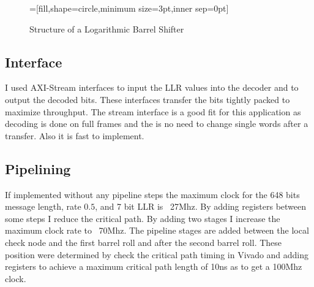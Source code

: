 \begin{figure}
    =[fill,shape=circle,minimum size=3pt,inner sep=0pt]
    \centering
    \caption{Structure of a Logarithmic Barrel Shifter}
    \label{log_shift}
\end{figure}

\subsection{Interface}
I used AXI-Stream interfaces to input the LLR values into the decoder and to output the decoded bits. These interfaces transfer the bits tightly packed to maximize throughput. The stream interface is a good fit for this application as decoding is done on full frames and the is no need to change single words after a transfer. Also it is fast to implement.

\subsection{Pipelining}
If implemented without any pipeline steps the maximum clock for the 648 bits message length, rate $0.5$, and 7 bit LLR is ~27Mhz. By adding registers between some steps I reduce the critical path. By adding two stages I increase the maximum clock rate to ~70Mhz. The pipeline stages are added between the local check node and the first barrel roll and after the second barrel roll. These position were determined by check the critical path timing in Vivado and adding registers to achieve a maximum critical path length of 10ns as to get a 100Mhz clock. 

